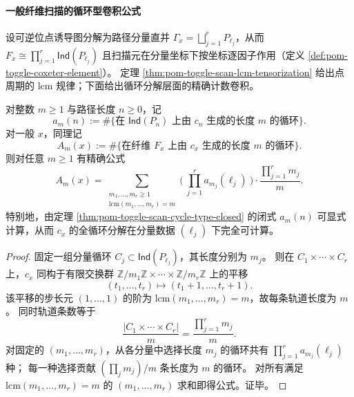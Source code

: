 \paragraph{一般纤维扫描的循环型卷积公式}
设可逆位点诱导图分解为路径分量直并 \(\Gamma_x=\bigsqcup_{j=1}^r P_{\ell_j}\)，从而
\(
F_x\cong \prod_{j=1}^r \mathsf{Ind}(P_{\ell_j})
\)
且扫描元在分量坐标下按坐标逐因子作用（定义 \ref{def:pom-toggle-coxeter-element}）。
定理 \ref{thm:pom-toggle-scan-lcm-tensorization} 给出点周期的 \(\mathrm{lcm}\) 规律；下面给出循环分解层面的精确计数卷积。

\begin{proposition}\label{prop:pom-toggle-scan-cycle-convolution}
对整数 \(m\ge 1\) 与路径长度 \(n\ge 0\)，记
\[
a_m(n):=\#\{\text{在 }\mathsf{Ind}(P_n)\text{ 上由 }c_n\text{ 生成的长度 }m\text{ 的循环}\}.
\]
对一般 \(x\)，同理记
\[
A_m(x):=\#\{\text{在纤维 }F_x\text{ 上由 }c_x\text{ 生成的长度 }m\text{ 的循环}\}.
\]
则对任意 \(m\ge 1\) 有精确公式
\[
A_m(x)=\sum_{\substack{m_1,\dots,m_r\ge 1\\ \mathrm{lcm}(m_1,\dots,m_r)=m}}
\Biggl(\ \prod_{j=1}^r a_{m_j}(\ell_j)\ \Biggr)\cdot \frac{\prod_{j=1}^r m_j}{m}.
\]
特别地，由定理 \ref{thm:pom-toggle-scan-cycle-type-closed} 的闭式 \(a_m(n)\) 可显式计算，从而 \(c_x\) 的全循环分解在分量数据 \((\ell_j)\) 下完全可计算。
\end{proposition}
\begin{proof}
固定一组分量循环 \(C_j\subset \mathsf{Ind}(P_{\ell_j})\)，其长度分别为 \(m_j\)。
则在 \(C_1\times\cdots\times C_r\) 上，\(c_x\) 同构于有限交换群
\(
\mathbb Z/m_1\mathbb Z\times\cdots\times \mathbb Z/m_r\mathbb Z
\)
上的平移
\[
(t_1,\dots,t_r)\longmapsto (t_1+1,\dots,t_r+1).
\]
该平移的步长元 \((1,\dots,1)\) 的阶为 \(\mathrm{lcm}(m_1,\dots,m_r)=m\)，故每条轨道长度为 \(m\)。
同时轨道条数等于
\[
\frac{|C_1\times\cdots\times C_r|}{m}=\frac{\prod_{j=1}^r m_j}{m}.
\]
对固定的 \((m_1,\dots,m_r)\)，从各分量中选择长度 \(m_j\) 的循环共有 \(\prod_{j=1}^r a_{m_j}(\ell_j)\) 种；
每一种选择贡献 \((\prod_j m_j)/m\) 条长度为 \(m\) 的循环。
对所有满足 \(\mathrm{lcm}(m_1,\dots,m_r)=m\) 的 \((m_1,\dots,m_r)\) 求和即得公式。证毕。
\end{proof}


